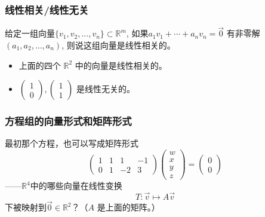 \documentclass[CJK]{beamer}
\begin{document}
\begin{frame}
\frametitle{线性相关/线性无关}
给定一组向量$\{v_1, v_2, ... , v_n\}\subset \mathbb R^m$, 如果$a_1v_1 + \cdots + a_n v_n = \vec{0}$ 有\alert{非零解} $(a_1, a_2, \ldots, a_n)$, 则说这组向量是线性相关的。

\begin{itemize}
	\item 上面的四个 $\mathbb R^2$ 中的向量是线性相关的。
	\item $\begin{pmatrix} 1 \\ 0 \end{pmatrix}, \begin{pmatrix} 1  \\ 1\end{pmatrix}$ 是线性无关的。
\end{itemize}
\end{frame}

\begin{frame}

\frametitle{方程组的向量形式和矩阵形式}
最初那个方程，也可以写成\alert{矩阵形式}
\[
\begin{pmatrix} 1 & 1 & 1 & -1 \\ 0 & 1 & -2 & 3 \end{pmatrix} \begin{pmatrix} w \\ x \\ y \\ z \end{pmatrix} = \begin{pmatrix} 0 \\ 0 \end{pmatrix}
\]
——$\mathbb{R}^4$中的哪些向量在线性变换
\[T: \vec{v}\mapsto A\vec{v}\] 
下被映射到$\vec{0}\in\mathbb{R}^2$？（$A$ 是上面的矩阵。）

\end{frame}
\end{document}
